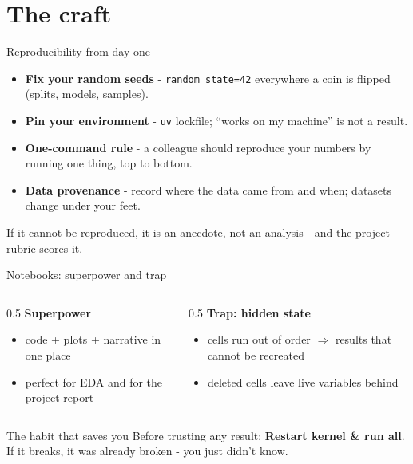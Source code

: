 \documentclass[10pt,aspectratio=169]{beamer}
\begin{document}
\section{The craft}

\begin{frame}{Reproducibility from day one}
  \begin{itemize}
    \item \textbf{Fix your random seeds} - \texttt{random\_state=42}
          everywhere a coin is flipped (splits, models, samples).
    \item \textbf{Pin your environment} - \texttt{uv} lockfile; ``works on my
          machine'' is not a result.
    \item \textbf{One-command rule} - a colleague should reproduce your
          numbers by running one thing, top to bottom.
    \item \textbf{Data provenance} - record where the data came from and
          when; datasets change under your feet.
  \end{itemize}
  \vspace{0.6em}
  \begin{center}
    If it cannot be reproduced, it is an \alert{anecdote}, not an analysis -
    and the project rubric scores it.
  \end{center}
\end{frame}

\begin{frame}{Notebooks: superpower and trap}
  \begin{columns}[T]
    \begin{column}{0.5\textwidth}
      \textbf{Superpower}
      \begin{itemize}\small
        \item code + plots + narrative in one place
        \item perfect for EDA and for the project report
      \end{itemize}
    \end{column}
    \begin{column}{0.5\textwidth}
      \textbf{Trap: hidden state}
      \begin{itemize}\small
        \item cells run out of order $\Rightarrow$ results that cannot be
              recreated
        \item deleted cells leave live variables behind
      \end{itemize}
    \end{column}
  \end{columns}
  \vspace{0.7em}
  \begin{alertblock}{The habit that saves you}
    Before trusting any result: \textbf{Restart kernel \& run all}.
    If it breaks, it was already broken - you just didn't know.
  \end{alertblock}
\end{frame}
\end{document}
